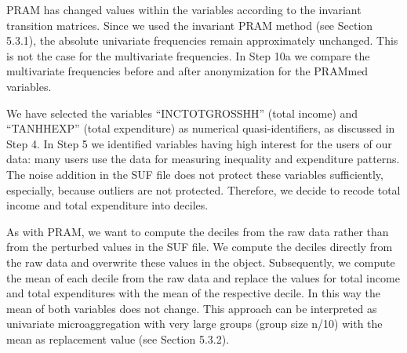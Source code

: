 \documentclass[letterpaper,10pt,english]{sphinxmanual}
\begin{document}
\begin{DUlineblock}{0em}
\item[] 
\item[] \sphinxcode{\sphinxupquote{\#\# - - - - - - - - - - -}}
\item[] 
\item[] 
\item[] 
\item[] 
\item[] 
\item[] 
\item[] 
\item[] 
\item[] 
\end{DUlineblock}

PRAM has changed values within the variables according to the invariant
transition matrices. Since we used the invariant PRAM method (see
Section 5.3.1), the absolute univariate frequencies remain approximately
unchanged. This is not the case for the multivariate frequencies. In
Step 10a we compare the multivariate frequencies before and after
anonymization for the PRAMmed variables.


We have selected the variables “INCTOTGROSSHH” (total income) and
“TANHHEXP” (total expenditure) as numerical quasi-identifiers, as
discussed in Step 4. In Step 5 we identified variables having high
interest for the users of our data: many users use the data for
measuring inequality and expenditure patterns. The noise addition in the
SUF file does not protect these variables sufficiently, especially,
because outliers are not protected. Therefore, we decide to recode total
income and total expenditure into deciles.

As with PRAM, we want to compute the deciles from the raw data rather
than from the perturbed values in the SUF file. We compute the deciles
directly from the raw data and overwrite these values in the 
object. Subsequently, we compute the mean of each decile from the raw
data and replace the values for total income and total expenditures with
the mean of the respective decile. In this way the mean of both
variables does not change. This approach can be interpreted as
univariate microaggregation with very large groups (group size n/10)
with the mean as replacement value (see Section 5.3.2).
\end{document}
